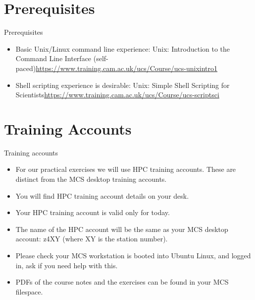 \section{Prerequisites}
\begin{frame}{Prerequisites}
\begin{itemize}
\item{Basic Unix/Linux command line experience:\hfill\break
\alert{Unix: Introduction to the Command Line Interface (self-paced)}\hfill\break \small\url{https://www.training.cam.ac.uk/ucs/Course/ucs-unixintro1}}
\pause
\item{Shell scripting experience is desirable:\hfill\break
\alert{Unix: Simple Shell Scripting for Scientists}\hfill\break  \small\url{https://www.training.cam.ac.uk/ucs/Course/ucs-scriptsci}}
\end{itemize}
\end{frame}

\section{Training Accounts}
\begin{frame}{Training accounts}
\begin{itemize}
\item{\alert{For our practical exercises we will use HPC training accounts.} These are distinct from the MCS desktop training accounts.}
\pause
\item{You will find HPC training account details on your desk.}
\pause
\item{Your HPC training account is valid only for today.}
\pause
\item{The name of the HPC account will be the same as your MCS desktop account: z4\alert{XY} (where \alert{XY} is the station number).}
\item{Please check your MCS workstation is booted into Ubuntu Linux, and logged in, ask if you need help with this.}
\item{PDFs of the course notes and the exercises can be found in your MCS filespace.}
\end{itemize}
\end{frame}

